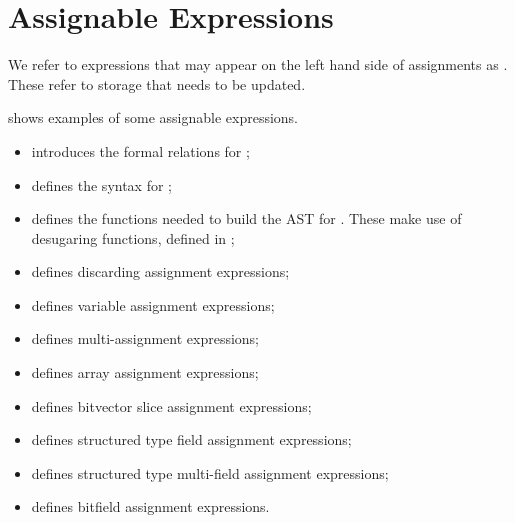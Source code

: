 \chapter{Assignable Expressions\label{chap:AssignableExpressions}}

\hypertarget{def-assignableexpression}{}
We refer to expressions that may appear on the left hand side of assignments as \assignableexpressions.
These refer to storage that needs to be updated.

 shows examples of some assignable expressions.

\ChapterOutline
\begin{itemize}
  \item {} introduces the formal relations for
        \assignableexpressions;
  \item {} defines the syntax for \assignableexpressions;
  \item {} defines the functions needed to build
        the AST for \assignableexpressions{}. These make use of desugaring functions,
        defined in ;
  \item {} defines discarding assignment expressions;
  \item {} defines variable assignment expressions;
  \item {} defines multi-assignment expressions;
  \item {} defines array assignment expressions;
  \item {} defines bitvector slice assignment expressions;
  \item {} defines structured type field assignment expressions;
  \item {} defines structured type multi-field assignment expressions;
  \item {} defines bitfield assignment expressions.
\end{itemize}

